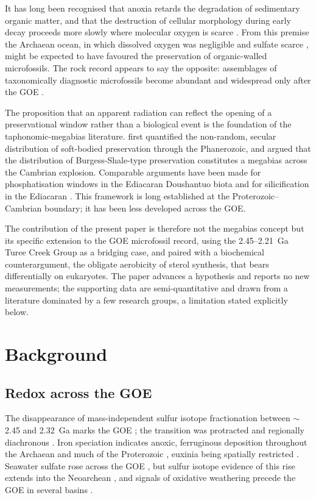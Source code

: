\documentclass[11pt]{article}
\begin{document}
It has long been recognised that anoxia retards the degradation of sedimentary organic matter, and
that the destruction of cellular morphology during early decay proceeds more slowly where molecular
oxygen is scarce \citep{Canfield1994,Hedges1995}. From this premise the Archaean ocean, in which
dissolved oxygen was negligible \citep{Pavlov2002} and sulfate scarce \citep{Habicht2002,Crowe2014},
might be expected to have favoured the preservation of organic-walled microfossils. The rock record
appears to say the opposite: assemblages of taxonomically diagnostic microfossils become abundant
and widespread only after the GOE \citep{Javaux2018,Wacey2014}.

The proposition that an apparent radiation can reflect the opening of a preservational window rather
than a biological event is the foundation of the taphonomic-megabias literature. \citet{Allison1993}
first quantified the non-random, secular distribution of soft-bodied preservation through the
Phanerozoic, and \citet{Butterfield2003} argued that the distribution of Burgess-Shale-type
preservation constitutes a megabias across the Cambrian explosion. Comparable arguments have been
made for phosphatisation windows in the Ediacaran Doushantuo biota and for silicification in the
Ediacaran \citep{Tarhan2016}. This framework is long established at the Proterozoic--Cambrian
boundary; it has been less developed across the GOE.

The contribution of the present paper is therefore not the megabias concept but its specific
extension to the GOE microfossil record, using the 2.45--2.21~Ga Turee Creek Group as a bridging
case, and paired with a biochemical counterargument, the obligate aerobicity of sterol synthesis,
that bears differentially on eukaryotes. The paper advances a hypothesis and reports no new
measurements; the supporting data are semi-quantitative and drawn from a literature dominated by a
few research groups, a limitation stated explicitly below.

\section{Background}

\subsection{Redox across the GOE}

The disappearance of mass-independent sulfur isotope fractionation between $\sim$2.45 and 2.32~Ga
marks the GOE \citep{Holland2006,Bekker2004,Pavlov2002,Farquhar2000}; the transition was protracted
and regionally diachronous \citep{Lyons2014,Philippot2018}. Iron speciation indicates anoxic,
ferruginous deposition throughout the Archaean and much of the Proterozoic
\citep{Canfield1998,Poulton2005,Poulton2011}, euxinia being spatially restricted
\citep{Reinhard2009}. Seawater sulfate rose across the GOE \citep{Habicht2002,Kah2004,Crowe2014},
but sulfur isotope evidence of this rise extends into the Neoarchean \citep{Reinhard2009}, and
signals of oxidative weathering precede the GOE in several basins \citep{Anbar2007}.
\end{document}
